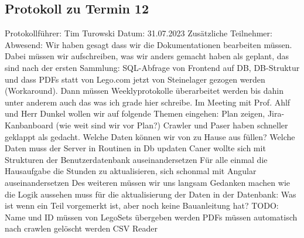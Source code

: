 \subsection{Protokoll zu Termin 12}
Protokollführer: Tim Turowski\newline
Datum: 31.07.2023 \newline
Zusätzliche Teilnehmer:  \newline
Abwesend: \newline \newline
Wir haben gesagt dass wir die Dokumentationen bearbeiten müssen. Dabei müssen wir aufschreiben, was wir anders gemacht haben als geplant, das sind nach der ersten Sammlung: SQL-Abfrage von Frontend auf DB, DB-Struktur und dass PDFs statt von Lego.com jetzt von Steinelager gezogen werden (Workaround). Dann müssen Weeklyprotokolle überarbeitet werden bis dahin unter anderem auch das was ich grade hier schreibe. Im Meeting mit Prof. Ahlf und Herr Dunkel wollen wir auf folgende Themen eingehen: Plan zeigen, Jira-Kanbanboard (wie weit sind wir vor Plan?) Crawler und Paser haben schneller geklappt als gedacht. Welche Daten können wir von zu Hause aus füllen? Welche Daten muss der Server in Routinen in Db updaten Caner wollte sich mit Strukturen der Benutzerdatenbank auseinandersetzen Für alle einmal die Hausaufgabe die Stunden zu aktualisieren, sich schonmal mit Angular auseinandersetzen Des weiteren müssen wir uns langsam Gedanken machen wie die Logik aussehen muss für die aktualisierung der Daten in der Datenbank: Was ist wenn ein Teil vorgemerkt ist, aber noch keine Bauanleitung hat? TODO: Name und ID müssen von LegoSets übergeben werden PDFs müssen automatisch nach crawlen gelöscht werden CSV Reader
\newpage
